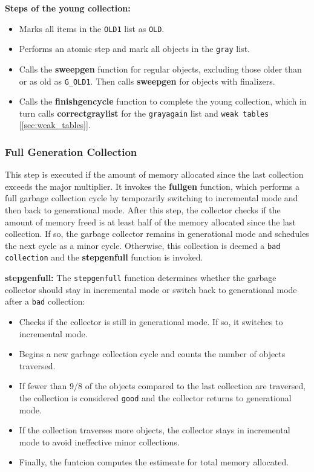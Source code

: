 \documentclass[10pt]{article}
\begin{document}
\textbf{Steps of the young collection:}
\begin{itemize}
  \item Marks all items in the \texttt{OLD1} list as \texttt{OLD}. 
  \item Performs an atomic step and mark all objects in the \texttt{gray} list.
  \item Calls the \textbf{sweepgen} function for regular objects, excluding those older than or as old as \texttt{G\_OLD1}. Then calls \textbf{sweepgen} for objects with finalizers.
  \item Calls the \textbf{finishgencycle} function to complete the young collection, which in turn calls \textbf{correctgraylist} for the \texttt{grayagain} list and \texttt{weak tables} [\ref{sec:weak_tables}].
\end{itemize}

\subsubsection{Full Generation Collection}
This step is executed if the amount of memory allocated since the last collection exceeds the major multiplier. It invokes the \textbf{fullgen} function, which performs a full garbage collection cycle by temporarily switching to incremental mode and then back to generational mode. After this step, the collector checks if the amount of memory freed is at least half of the memory allocated since the last collection. If so, the garbage collector remains in generational mode and schedules the next cycle as a minor cycle. Otherwise, this collection is deemed a \texttt{bad collection} and the \textbf{stepgenfull} function is invoked.

\textbf{stepgenfull:} The \texttt{stepgenfull} function determines whether the garbage collector should stay in incremental mode or switch back to generational mode after a \texttt{bad} collection:
\begin{itemize}
    \item Checks if the collector is still in generational mode. If so, it switches to incremental mode.
    \item Begins a new garbage collection cycle and counts the number of objects traversed.
    \item If fewer than 9/8 of the objects compared to the last collection are traversed, the collection is considered \texttt{good} and the collector returns to generational mode.
    \item If the collection traverses more objects, the collector stays in incremental mode to avoid ineffective minor collections. 
    \item Finally, the funtcion computes the estimeate for total memory allocated.
\end{itemize}
\end{document}
